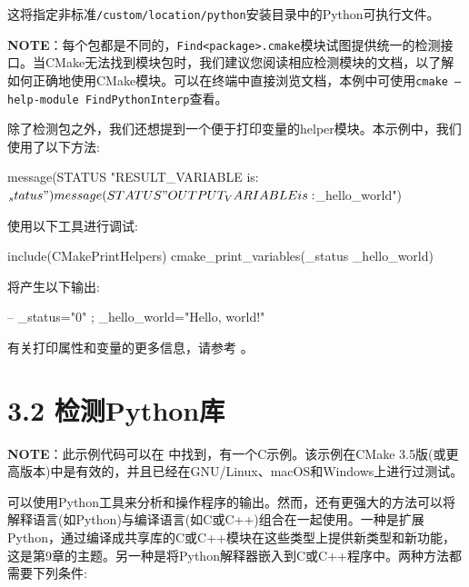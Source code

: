 
这将指定非标准\texttt{/custom/location/python}安装目录中的Python可执行文件。

\begin{myInfoBox}
\textbf{NOTE}：每个包都是不同的，\texttt{Find<package>.cmake}模块试图提供统一的检测接口。当CMake无法找到模块包时，我们建议您阅读相应检测模块的文档，以了解如何正确地使用CMake模块。可以在终端中直接浏览文档，本例中可使用\texttt{cmake --help-module FindPythonInterp}查看。
\end{myInfoBox}

除了检测包之外，我们还想提到一个便于打印变量的helper模块。本示例中，我们使用了以下方法:

\begin{codebox}[cmake]
message(STATUS "RESULT_VARIABLE is: ${_status}")
message(STATUS "OUTPUT_VARIABLE is: ${_hello_world}")
\end{codebox}

使用以下工具进行调试:

\begin{codebox}[cmake]
include(CMakePrintHelpers)
cmake_print_variables(_status _hello_world)
\end{codebox}

将产生以下输出:

\begin{codebox}[shell]
-- _status="0" ; _hello_world="Hello, world!"
\end{codebox}

有关打印属性和变量的更多信息，请参考  。


\section{3.2 检测Python库}

\begin{myInfoBox}
\textbf{NOTE}：此示例代码可以在  中找到，有一个C示例。该示例在CMake 3.5版(或更高版本)中是有效的，并且已经在GNU/Linux、macOS和Windows上进行过测试。
\end{myInfoBox}

可以使用Python工具来分析和操作程序的输出。然而，还有更强大的方法可以将解释语言(如Python)与编译语言(如C或C++)组合在一起使用。一种是扩展Python，通过编译成共享库的C或C++模块在这些类型上提供新类型和新功能，这是第9章的主题。另一种是将Python解释器嵌入到C或C++程序中。两种方法都需要下列条件:

